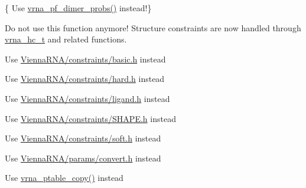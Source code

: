 \begin{DoxyRefList}
\item[\label{deprecated__deprecated000113}%
\Hypertarget{deprecated__deprecated000113}%
Global \hyperlink{group__part__func__global__deprecated_ga94c19120130e66a667a10a3c8598550c}{compute\+\_\+probabilities} (double F\+AB, double F\+EA, double F\+EB, vrna\+\_\+ep\+\_\+t $\ast$pr\+AB, vrna\+\_\+ep\+\_\+t $\ast$prA, vrna\+\_\+ep\+\_\+t $\ast$prB, int Alength)]\{ Use \hyperlink{group__part__func__global_gaa1e39e73afb51fbaf4ae38f0c066c46b}{vrna\+\_\+pf\+\_\+dimer\+\_\+probs()} instead!\} 
\item[\label{deprecated__deprecated000154}%
\Hypertarget{deprecated__deprecated000154}%
Global \hyperlink{hard_8h_a36c3a6c3218b041f992052767bc74549}{constrain\+\_\+ptypes} (const char $\ast$constraint, unsigned int length, char $\ast$ptype, int $\ast$\+BP, int min\+\_\+loop\+\_\+size, unsigned int idx\+\_\+type)]Do not use this function anymore! Structure constraints are now handled through \hyperlink{group__hard__constraints_gac7e4c4f8abe3163a68110c5bff24e01d}{vrna\+\_\+hc\+\_\+t} and related functions. 
\item[\label{deprecated__deprecated000040}%
\Hypertarget{deprecated__deprecated000040}%
File \hyperlink{constraints_8h}{constraints.h} ]Use \hyperlink{constraints_2basic_8h}{Vienna\+R\+N\+A/constraints/basic.\+h} instead  
\item[\label{deprecated__deprecated000041}%
\Hypertarget{deprecated__deprecated000041}%
File \hyperlink{constraints__hard_8h}{constraints\+\_\+hard.h} ]Use \hyperlink{hard_8h}{Vienna\+R\+N\+A/constraints/hard.\+h} instead  
\item[\label{deprecated__deprecated000042}%
\Hypertarget{deprecated__deprecated000042}%
File \hyperlink{constraints__ligand_8h}{constraints\+\_\+ligand.h} ]Use \hyperlink{ligand_8h}{Vienna\+R\+N\+A/constraints/ligand.\+h} instead  
\item[\label{deprecated__deprecated000043}%
\Hypertarget{deprecated__deprecated000043}%
File \hyperlink{constraints__SHAPE_8h}{constraints\+\_\+\+S\+H\+A\+PE.h} ]Use \hyperlink{SHAPE_8h}{Vienna\+R\+N\+A/constraints/\+S\+H\+A\+P\+E.\+h} instead  
\item[\label{deprecated__deprecated000044}%
\Hypertarget{deprecated__deprecated000044}%
File \hyperlink{constraints__soft_8h}{constraints\+\_\+soft.h} ]Use \hyperlink{soft_8h}{Vienna\+R\+N\+A/constraints/soft.\+h} instead  
\item[\label{deprecated__deprecated000045}%
\Hypertarget{deprecated__deprecated000045}%
File \hyperlink{convert__epars_8h}{convert\+\_\+epars.h} ]Use \hyperlink{convert_8h}{Vienna\+R\+N\+A/params/convert.\+h} instead  
\item[\label{deprecated__deprecated000186}%
\Hypertarget{deprecated__deprecated000186}%
Global \hyperlink{group__struct__utils__deprecated_gafeaa6d68eef3a99d0a7aa08aa91c6601}{copy\+\_\+pair\+\_\+table} (const short $\ast$pt)]Use \hyperlink{group__struct__utils__pair__table_ga2daefbbd6d9f8803731651882f54332d}{vrna\+\_\+ptable\+\_\+copy()} instead



\end{DoxyRefList}

